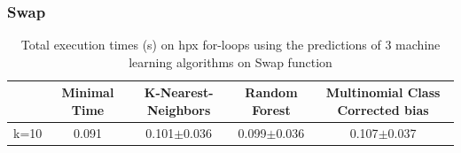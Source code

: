 \subsubsection{Swap}

\begin{table}[H]
	\centering
	\caption{Total execution times (s) on hpx for-loops using the predictions of 3 machine learning algorithms on Swap function}
	\label{my-label}
	\begin{tabular}{|c|c|c|c|c|}
		\hline
		& Minimal Time&K-Nearest-Neighbors & Random Forest &Multinomial Class Corrected bias\\ \hline
		k=10  &0.091&
		0.101$\pm$0.036       & 0.099$\pm$0.036&0.107$\pm$0.037 \\ \hline
	\end{tabular}
\end{table}

